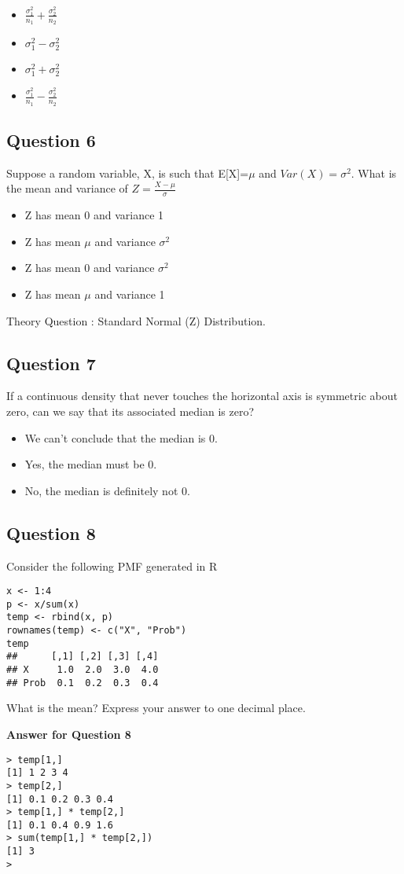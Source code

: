\documentclass[]{article}
\begin{document}
\begin{itemize}
\item $\frac{\sigma^2_1}{n_1}+ \frac{\sigma^2_2}{n_2}$
\item $\sigma^2_1−\sigma^2_2$
\item $\sigma^2_1+\sigma^2_2$
\item $\frac{\sigma^2_1}{n_1}- \frac{\sigma^2_2}{n_2}$
\end{itemize}
\subsection{Question 6}
Suppose a random variable, X, is such that E[X]=$\mu$  and $Var(X)=\sigma^2$. 
What is the mean and variance of $Z= \frac{X−\mu}{\sigma}$

\begin{itemize}
\item Z has mean 0 and variance 1
\item Z has mean $\mu$ and variance $\sigma^2$
\item Z has mean 0 and variance $\sigma^2$
\item Z has mean $\mu$ and variance 1
\end{itemize}

Theory Question : Standard Normal (Z) Distribution.

\subsection{Question 7}
If a continuous density that never touches the horizontal axis is symmetric about zero, can we say that its associated median is zero?

\begin{itemize}
\item We can't conclude that the median is 0.
\item Yes, the median must be 0.
\item No, the median is definitely not 0.
\end{itemize}



\subsection{Question 8}
Consider the following PMF generated in R

\begin{verbatim}
x <- 1:4
p <- x/sum(x)
temp <- rbind(x, p)
rownames(temp) <- c("X", "Prob")
temp
##      [,1] [,2] [,3] [,4]
## X     1.0  2.0  3.0  4.0
## Prob  0.1  0.2  0.3  0.4
\end{verbatim}
What is the mean? Express your answer to one decimal place.

\textbf{Answer for Question 8}
\begin{verbatim}
> temp[1,]
[1] 1 2 3 4
> temp[2,]
[1] 0.1 0.2 0.3 0.4
> temp[1,] * temp[2,]
[1] 0.1 0.4 0.9 1.6
> sum(temp[1,] * temp[2,])
[1] 3
> 
\end{verbatim}
\end{document}
